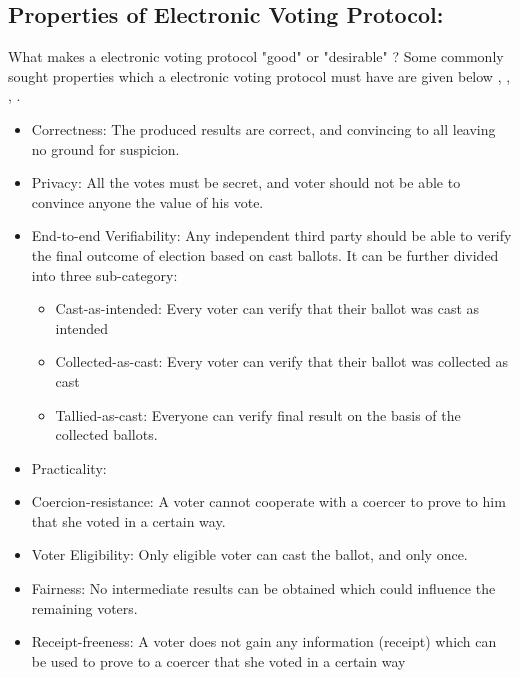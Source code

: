 \subsection{Properties of Electronic Voting Protocol:} 
 What makes a electronic voting protocol  "good" or "desirable" ?  Some commonly sought 
 properties which a electronic voting protocol must have are given below \citep{5958051}, 
 \citep{Benaloh:1994:RSE:195058.195407},  \citep{Delaune:2010:VPT}, \citep{Bernhard:2017:PES}.
 \begin{itemize}
 
  \item Correctness:
 	The produced results are correct, and convincing to all leaving no  ground for suspicion. 
 	
 \item Privacy:
    All the votes must be secret, and voter should not be able to convince anyone the 
    value of his vote.
 
 \item End-to-end Verifiability:
 Any independent third party should be able to verify the final outcome of election based on cast 
 ballots.  It can be further divided into three sub-category:
 
 \begin{itemize}
  \item Cast-as-intended: Every voter can verify that their ballot was cast as
  intended
  \item Collected-as-cast: Every voter can verify that their ballot was collected as
  cast
  \item Tallied-as-cast: Everyone can verify final result on the basis of the
  collected ballots.
\end{itemize}

\item Practicality: 
  
\item Coercion-resistance:
	A voter cannot cooperate with a coercer to prove to him that she voted in a certain way.
  
\item Voter Eligibility:
  Only eligible voter can cast the ballot, and only once.

\item Fairness:
  No intermediate results can be obtained which could influence the remaining voters.

\item Receipt-freeness:
A voter does not gain any information (receipt) which can be used to prove to a coercer that
she voted in a certain way

 \end{itemize}
 

